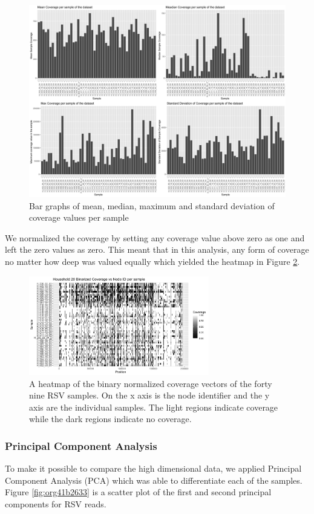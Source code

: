 \documentclass[10pt, a4paper]{article}
\begin{document}
\begin{figure}[h]
\centering
\includegraphics[width=.9\linewidth]{../Figures/RSV/structure_of_coverage_data.png}
\caption[RSV Structure of the Data]{\label{fig:orgef825ec}
Bar graphs of mean, median, maximum and standard deviation of coverage values per sample}
\end{figure}


We normalized the coverage by setting any coverage value above zero as one and 
left the zero values as zero. This meant that in this analysis, any form of
coverage no matter how deep was valued equally which yielded the heatmap in
Figure \ref{fig:orgd885cc2}.

\begin{figure}[h!]
\centering
\includegraphics[width=0.7\textwidth]{../Figures/RSV/Heatmap.png}
\caption[RSV heatmap]{\label{fig:orgd885cc2}
A heatmap of the binary normalized coverage vectors of the forty nine RSV samples. On the x axis is the node identifier and the y axis are the individual samples. The light regions indicate coverage while the dark regions indicate no coverage.}
\end{figure}

\newpage
\subsubsection{Principal Component Analysis}
\label{sec:orgbc9df38}
To make it possible to compare the high dimensional data, we applied Principal 
Component Analysis (PCA) which was able to differentiate each of the samples.
Figure \ref{fig:org41b2633} is a scatter plot of the first and second principal 
components for RSV reads.
\end{document}
